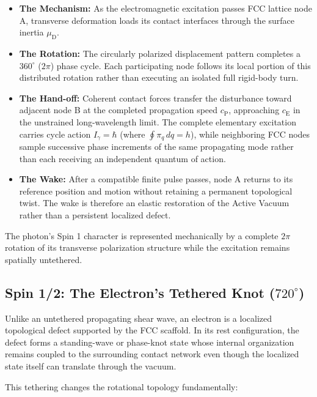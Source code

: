 \begin{itemize}
    \item \textbf{The Mechanism:} As the electromagnetic excitation passes FCC lattice node A, transverse deformation loads its contact interfaces through the surface inertia $\mu_{\mathrm D}$.
    \item \textbf{The Rotation:} The circularly polarized displacement pattern completes a $360^{\circ}$ ($2\pi$) phase cycle. Each participating node follows its local portion of this distributed rotation rather than executing an isolated full rigid-body turn.
    \item \textbf{The Hand-off:} Coherent contact forces transfer the disturbance toward adjacent node B at the completed propagation speed $c_{\mathrm P}$, approaching $c_{\mathrm E}$ in the unstrained long-wavelength limit. The complete elementary excitation carries cycle action $I_{\gamma} = \hbar$ (where $\oint \pi_q\,dq = h$), while neighboring FCC nodes sample successive phase increments of the same propagating mode rather than each receiving an independent quantum of action.
    \item \textbf{The Wake:} After a compatible finite pulse passes, node A returns to its reference position and motion without retaining a permanent topological twist. The wake is therefore an elastic restoration of the Active Vacuum rather than a persistent localized defect.
\end{itemize}

The photon's Spin 1 character is represented mechanically by a complete $2\pi$ rotation of its transverse polarization structure while the excitation remains spatially untethered.

\subsection{Spin 1/2: The Electron's Tethered Knot ($720^{\circ}$)}

Unlike an untethered propagating shear wave, an electron is a localized topological defect supported by the FCC scaffold. In its rest configuration, the defect forms a standing-wave or phase-knot state whose internal organization remains coupled to the surrounding contact network even though the localized state itself can translate through the vacuum.

This tethering changes the rotational topology fundamentally:

